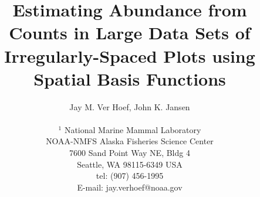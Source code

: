 \documentclass[12pt, titlepage]{article}\usepackage[]{graphicx}\usepackage[]{color}
\begin{document}

\titlepage
\title {Estimating Abundance from Counts in Large Data Sets of Irregularly-Spaced Plots using Spatial Basis Functions}
\author{Jay M. Ver Hoef, John K. Jansen\\
\hrulefill \\
$^{1}$ 
National Marine Mammal Laboratory\\
NOAA-NMFS Alaska Fisheries Science Center\\
7600 Sand Point Way NE, Bldg 4\\
Seattle, WA  98115-6349 USA\\
tel: (907) 456-1995 \\
E-mail: jay.verhoef@noaa.gov\\
\hrulefill \\
}

\maketitle

\end{document}
